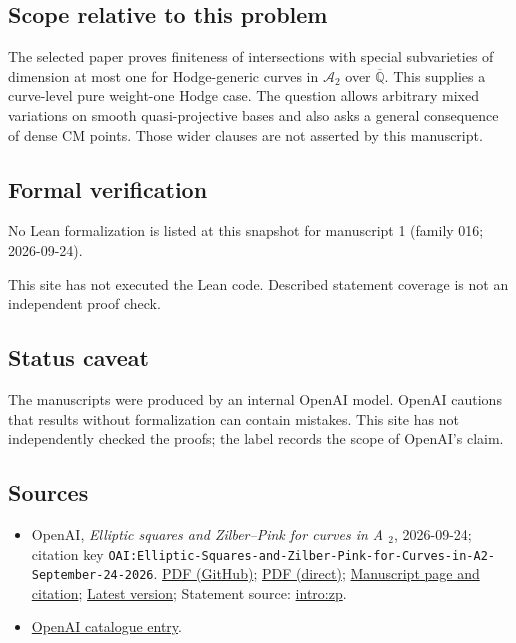 \documentclass[11pt]{article}
\begin{document}
\subsection{Scope relative to this problem}
The selected paper proves finiteness of intersections with special subvarieties of dimension at most one for Hodge-generic curves in $\mathcal A_2$ over $\overline{\mathbb Q}$. This supplies a curve-level pure weight-one Hodge case. The question allows arbitrary mixed variations on smooth quasi-projective bases and also asks a general consequence of dense CM points. Those wider clauses are not asserted by this manuscript.

\subsection{Formal verification}
No Lean formalization is listed at this snapshot for manuscript 1 (family 016; 2026-09-24).

This site has not executed the Lean code. Described statement coverage is not an independent proof check.

\subsection{Status caveat}
The manuscripts were produced by an internal OpenAI model. OpenAI cautions that results without formalization can contain mistakes. This site has not independently checked the proofs; the label records the scope of OpenAI's claim.

\subsection{Sources}
\begin{itemize}
\item OpenAI, \emph{Elliptic squares and Zilber–Pink for curves in A \({}_{2}\)}, 2026-09-24; citation key \texttt{OAI:Elliptic-Squares-and-Zilber-Pink-for-Curves-in-A2-September-24-2026}. \href{https://github.com/openai/math/blob/adc7f1241b42e322a6451854ab7e4b4c146bf78a/preprints/Elliptic-Squares-and-Zilber-Pink-for-Curves-in-A2-September-24-2026/paper.pdf}{PDF (GitHub)}; \href{https://github.com/openai/math/raw/adc7f1241b42e322a6451854ab7e4b4c146bf78a/preprints/Elliptic-Squares-and-Zilber-Pink-for-Curves-in-A2-September-24-2026/paper.pdf}{PDF (direct)}; \href{https://github.com/openai/math/blob/adc7f1241b42e322a6451854ab7e4b4c146bf78a/preprints/Elliptic-Squares-and-Zilber-Pink-for-Curves-in-A2-September-24-2026/README.md}{Manuscript page and citation}; \href{https://github.com/openai/math/blob/main/preprints/Elliptic-Squares-and-Zilber-Pink-for-Curves-in-A2-September-24-2026/paper.pdf}{Latest version}; Statement source: \href{https://github.com/openai/math/blob/adc7f1241b42e322a6451854ab7e4b4c146bf78a/preprints/Elliptic-Squares-and-Zilber-Pink-for-Curves-in-A2-September-24-2026/build/sections/01-introduction.tex\#L66}{intro:zp}.
\item \href{https://github.com/openai/math/blob/adc7f1241b42e322a6451854ab7e4b4c146bf78a/CONTENTS.md}{OpenAI catalogue entry}.
\end{itemize}
\end{document}
